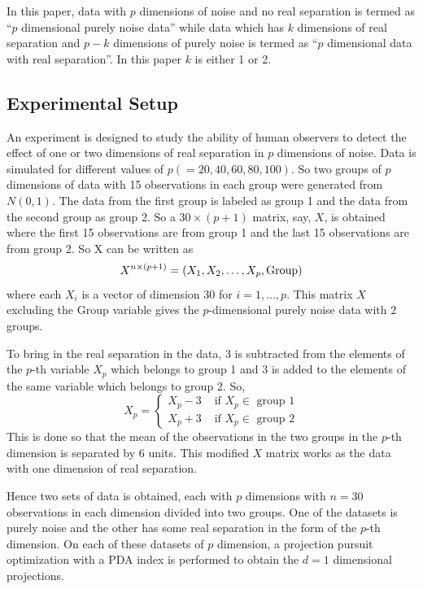 \documentclass[12]{article}
\newcommand{\blue}{\color{blue}}
\begin{document}

In this paper, data with $p$ dimensions of noise and no real separation is termed as ``$p$ dimensional purely noise data'' while data which has $k$ dimensions of real separation and $p - k$ dimensions of purely noise is termed as ``$p$ dimensional data with real separation''. In this paper $k$ is either 1 or 2. 

\subsection{Experimental Setup} \label{sec:experiment}


An experiment is designed to study the ability of human observers to detect the effect of one or two dimensions of real separation in $p$ dimensions of noise. Data is simulated for different values of $p  ( = 20, 40, 60, 80, 100)$.  So two groups of $p$ dimensions of data with 15 observations in each group were generated from $N(0, 1)$.  The data from the first group is labeled as group 1 and the data from the second group as group 2. So a $30 \times (p + 1)$ matrix, say, $X$, is obtained where the first 15 observations are from group 1 and the last 15 observations are from group 2.  So X can be written as
$$X^{n \times (p + 1)} = (X_1, X_2, \dots, X_p, \hbox{Group})$$ where each $X_i$ is a vector of dimension 30 for $i = 1, \dots, p$. This matrix $X$ excluding the Group variable gives the $p$-dimensional purely noise data with 2 groups.

To bring in the real separation in the data, 3 is subtracted from the elements of the $p$-th variable $X_p$ which belongs to group 1 and 3 is added to the elements of the same variable which belongs to group 2. So, 
$$
X_p = \left\{ \begin{array}{rl}
 X_p - 3 &\mbox{ if $X_p \in$ group 1} \\
 X_p + 3 &\mbox{ if $X_p \in$ group 2}
       \end{array} \right.
$$
This is done so that the mean of the observations in the two groups in the $p$-th dimension is separated by 6 units. This modified $X$ matrix works as the data with one dimension of real separation. 

Hence two sets of data is obtained, each with $p$ dimensions with $n = 30$ observations in each dimension divided into two groups. One of the datasets is purely noise and the other has some real separation in the form of the $p$-th dimension. On each of these datasets of $p$ dimension, a projection pursuit optimization with a PDA index is performed to obtain the $d = 1$ dimensional projections.  
\end{document}

